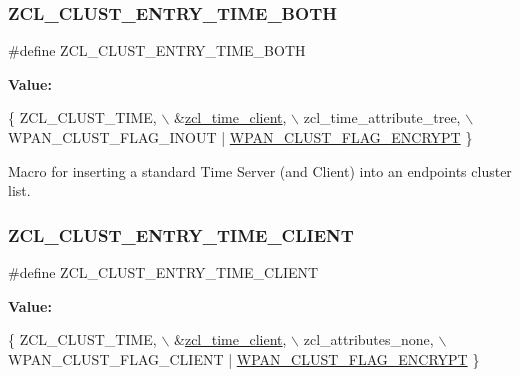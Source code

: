 \subsubsection{\texorpdfstring{Z\+C\+L\+\_\+\+C\+L\+U\+S\+T\+\_\+\+E\+N\+T\+R\+Y\+\_\+\+T\+I\+M\+E\+\_\+\+B\+O\+TH}{ZCL\_CLUST\_ENTRY\_TIME\_BOTH}}
{\footnotesize\ttfamily \#define Z\+C\+L\+\_\+\+C\+L\+U\+S\+T\+\_\+\+E\+N\+T\+R\+Y\+\_\+\+T\+I\+M\+E\+\_\+\+B\+O\+TH}

{\bfseries Value\+:}
\begin{DoxyCode}
\{ ZCL\_CLUST\_TIME,                \(\backslash\)
         &\hyperlink{group__zcl__time_ga2c66ee215547beae5b5dde4f23cc8e00}{zcl\_time\_client},             \(\backslash\)
         zcl\_time\_attribute\_tree,      \(\backslash\)
         WPAN\_CLUST\_FLAG\_INOUT | \hyperlink{group__wpan__aps_ga1eafd87038a2134da7a1f72e6801d23b}{WPAN\_CLUST\_FLAG\_ENCRYPT} \}
\end{DoxyCode}


Macro for inserting a standard Time Server (and Client) into an endpoint\textquotesingle{}s cluster list. 

\mbox{\label{group__zcl__time_gac043586e4bfcfa93f631aa144158a17c}} 
\subsubsection{\texorpdfstring{Z\+C\+L\+\_\+\+C\+L\+U\+S\+T\+\_\+\+E\+N\+T\+R\+Y\+\_\+\+T\+I\+M\+E\+\_\+\+C\+L\+I\+E\+NT}{ZCL\_CLUST\_ENTRY\_TIME\_CLIENT}}
{\footnotesize\ttfamily \#define Z\+C\+L\+\_\+\+C\+L\+U\+S\+T\+\_\+\+E\+N\+T\+R\+Y\+\_\+\+T\+I\+M\+E\+\_\+\+C\+L\+I\+E\+NT}

{\bfseries Value\+:}
\begin{DoxyCode}
\{ ZCL\_CLUST\_TIME,                \(\backslash\)
         &\hyperlink{group__zcl__time_ga2c66ee215547beae5b5dde4f23cc8e00}{zcl\_time\_client},             \(\backslash\)
         zcl\_attributes\_none,          \(\backslash\)
         WPAN\_CLUST\_FLAG\_CLIENT | \hyperlink{group__wpan__aps_ga1eafd87038a2134da7a1f72e6801d23b}{WPAN\_CLUST\_FLAG\_ENCRYPT} \}
\end{DoxyCode}


